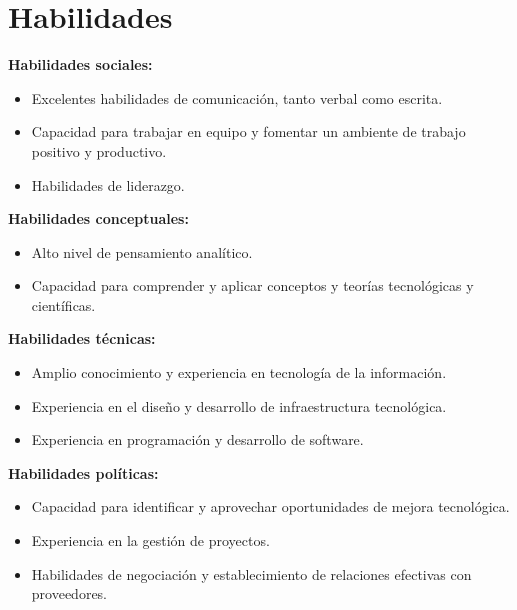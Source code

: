 \section{Habilidades}

\textbf{Habilidades sociales:}
\begin{itemize}
  \item Excelentes habilidades de comunicación, tanto verbal como escrita.
  \item Capacidad para trabajar en equipo y fomentar un ambiente de trabajo positivo y productivo.
  \item Habilidades de liderazgo.
\end{itemize}

\textbf{Habilidades conceptuales:}
\begin{itemize}
  \item Alto nivel de pensamiento analítico.
  \item Capacidad para comprender y aplicar conceptos y teorías tecnológicas y científicas.
\end{itemize}

\textbf{Habilidades técnicas:}
\begin{itemize}
  \item Amplio conocimiento y experiencia en tecnología de la información.
  \item Experiencia en el diseño y desarrollo de infraestructura tecnológica.
  \item Experiencia en programación y desarrollo de software.
\end{itemize}

\textbf{Habilidades políticas:}
\begin{itemize}
  \item Capacidad para identificar y aprovechar oportunidades de mejora tecnológica.
  \item Experiencia en la gestión de proyectos.
  \item Habilidades de negociación y establecimiento de relaciones efectivas con proveedores.
\end{itemize}


